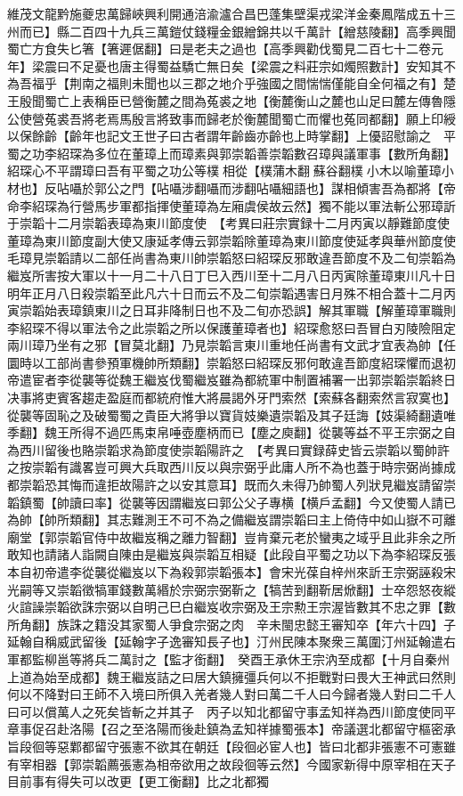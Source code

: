 維茂文龍黔施夔忠萬歸峽興利開通涪渝瀘合昌巴蓬集壁渠戎梁洋金秦鳳階成五十三州而已】縣二百四十九兵三萬鎧仗錢糧金銀繒錦共以千萬計【繒慈陵翻】高季興聞蜀亡方食失匕箸【箸遲倨翻】曰是老夫之過也【高季興勸伐蜀見二百七十二卷元年】梁震曰不足憂也唐主得蜀益驕亡無日矣【梁震之料莊宗如燭照數計】安知其不為吾福乎【荆南之福則未聞也以三郡之地介乎強國之間惴惴僅能自全何福之有】楚王殷聞蜀亡上表稱臣已營衡麓之間為菟裘之地【衡麓衡山之麓也山足曰麓左傳魯隱公使營菟裘吾將老焉馬殷言將致事而歸老於衡麓聞蜀亡而懼也菟同都翻】願上印綬以保餘齡【齡年也記文王世子曰古者謂年齡齒亦齡也上時掌翻】上優詔慰諭之　平蜀之功李紹琛為多位在董璋上而璋素與郭崇韜善崇韜數召璋與議軍事【數所角翻】紹琛心不平謂璋曰吾有平蜀之功公等樸相從【樸蒲木翻蘇谷翻樸小木以喻董璋小材也】反呫囁於郭公之門【呫囁涉翻囁而涉翻呫囁細語也】謀相傾害吾為都將【帝命李紹琛為行營馬步軍都指揮使董璋為左廂虞侯故云然】獨不能以軍法斬公邪璋訢于崇韜十二月崇韜表璋為東川節度使　【考異曰莊宗實録十二月丙寅以靜難節度使董璋為東川節度副大使又康延孝傳云郭崇韜除董璋為東川節度使延孝與華州節度使毛璋見崇韜請以二部任尚書為東川帥崇韜怒曰紹琛反邪敢違吾節度不及二旬崇韜為繼岌所害按大軍以十一月二十八日丁巳入西川至十二月八日丙寅除董璋東川凡十日明年正月八日殺崇韜至此凡六十日而云不及二旬崇韜遇害日月殊不相合蓋十二月丙寅崇韜始表璋鎮東川之日耳非降制日也不及二旬亦恐誤】解其軍職【解董璋軍職則李紹琛不得以軍法令之此崇韜之所以保護董璋者也】紹琛愈怒曰吾冒白刃陵險阻定兩川璋乃坐有之邪【冒莫北翻】乃見崇韜言東川重地任尚書有文武才宜表為帥【任圜時以工部尚書參預軍機帥所類翻】崇韜怒曰紹琛反邪何敢違吾節度紹琛懼而退初帝遣宦者李從襲等從魏王繼岌伐蜀繼岌雖為都統軍中制置補署一出郭崇韜崇韜終日决事將吏賓客趨走盈庭而都統府惟大將晨謁外牙門索然【索蘇各翻索然言寂寞也】從襲等固恥之及破蜀蜀之貴臣大將爭以寶貨妓樂遺崇韜及其子廷誨【妓渠綺翻遺唯季翻】魏王所得不過匹馬束帛唾壺塵柄而已【塵之庾翻】從襲等益不平王宗弼之自為西川留後也賂崇韜求為節度使崇韜陽許之　【考異曰實録薛史皆云崇韜以蜀帥許之按崇韜有識畧豈可興大兵取西川反以與宗弼乎此庸人所不為也蓋于時宗弼尚據成都崇韜恐其悔而違拒故陽許之以安其意耳】既而久未得乃帥蜀人列狀見繼岌請留崇韜鎮蜀【帥讀曰率】從襲等因謂繼岌曰郭公父子專横【横戶孟翻】今又使蜀人請已為帥【帥所類翻】其志難測王不可不為之備繼岌謂崇韜曰主上倚侍中如山嶽不可離廟堂【郭崇韜官侍中故繼岌稱之離力智翻】豈肯棄元老於蠻夷之域乎且此非余之所敢知也請諸人詣闕自陳由是繼岌與崇韜互相疑【此段自平蜀之功以下為李紹琛反張本自初帝遣李從襲從繼岌以下為殺郭崇韜張本】會宋光葆自梓州來訢王宗弼誣殺宋光嗣等又崇韜徵犒軍錢數萬緡於宗弼宗弼靳之【犒苦到翻靳居焮翻】士卒怨怒夜縱火諠譟崇韜欲誅宗弼以自明己巳白繼岌收宗弼及王宗勲王宗渥皆數其不忠之罪【數所角翻】族誅之籍没其家蜀人爭食宗弼之肉　辛未閩忠懿王審知卒【年六十四】子延翰自稱威武留後【延翰字子逸審知長子也】汀州民陳本聚衆三萬圍汀州延翰遣右軍都監柳邕等將兵二萬討之【監才銜翻】　癸酉王承休王宗汭至成都【十月自秦州上道為始至成都】魏王繼岌詰之曰居大鎮擁彊兵何以不拒戰對曰畏大王神武曰然則何以不降對曰王師不入境曰所俱入羌者幾人對曰萬二千人曰今歸者幾人對曰二千人曰可以償萬人之死矣皆斬之并其子　丙子以知北都留守事孟知祥為西川節度使同平章事促召赴洛陽【召之至洛陽而後赴鎮為孟知祥據蜀張本】帝議選北都留守樞密承旨段徊等惡鄴都留守張憲不欲其在朝廷【段徊必宦人也】皆曰北都非張憲不可憲雖有宰相器【郭崇韜薦張憲為相帝欲用之故段徊等云然】今國家新得中原宰相在天子目前事有得失可以改更【更工衡翻】比之北都獨